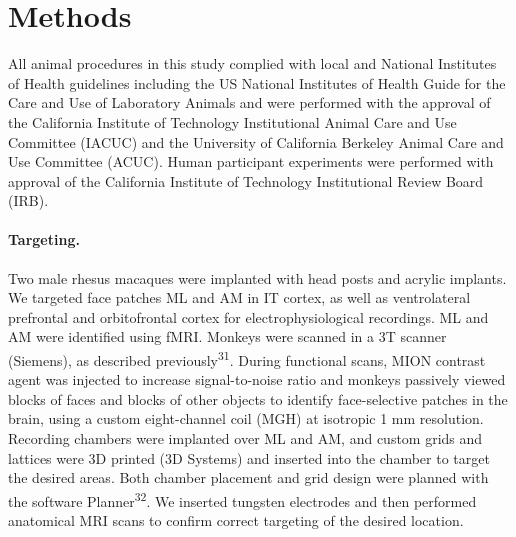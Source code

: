 \documentclass{article}
\begin{document}
\section*{Methods}

All animal procedures in this study complied with local and National Institutes of Health guidelines including the US National Institutes of Health Guide for the Care and Use of Laboratory Animals and were performed with the approval of the California Institute of Technology Institutional Animal Care and Use Committee (IACUC) and the University of California Berkeley Animal Care and Use Committee (ACUC). Human participant experiments were performed with approval of the California Institute of Technology Institutional Review Board (IRB).

\paragraph{Targeting.} Two male rhesus macaques were implanted with head posts and acrylic implants. We targeted face patches ML and AM in IT cortex, as well as ventrolateral prefrontal and orbitofrontal cortex for electrophysiological recordings. ML and AM were identified using fMRI. Monkeys were scanned in a 3T scanner (Siemens), as described previously\textsuperscript{31}. During functional scans, MION contrast agent was injected to increase signal-to-noise ratio and monkeys passively viewed blocks of faces and blocks of other objects to identify face-selective patches in the brain, using a custom eight-channel coil (MGH) at isotropic 1 mm resolution. Recording chambers were implanted over ML and AM, and custom grids and lattices were 3D printed (3D Systems) and inserted into the chamber to target the desired areas. Both chamber placement and grid design were planned with the software Planner\textsuperscript{32}. We inserted tungsten electrodes and then performed anatomical MRI scans to confirm correct targeting of the desired location.
\end{document}
